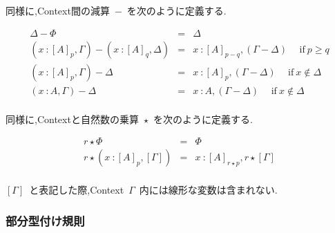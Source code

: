 \documentclass{jsarticle}
\begin{document}
同様に,Context間の減算\ $-$\ を次のように定義する.

\begin{eqnarray*}
  \Delta - \Phi &=& \Delta \\
  (x\ \colon [A]_p,\Gamma) - (x\ \colon [A]_q,\Delta) &=& x\ \colon [A]_{p-q},(\Gamma - \Delta) \hspace{15pt} \mbox{if}\ p \geq q \\
  (x\ \colon [A]_p,\Gamma) - \Delta &=& x\ \colon [A]_p,(\Gamma - \Delta) \hspace{15pt} \mbox{if}\ x \notin \Delta \\
  (x\ \colon A,\Gamma) - \Delta &=& x\ \colon A,(\Gamma - \Delta) \hspace{15pt} \mbox{if}\ x \notin \Delta \\
\end{eqnarray*}

同様に,Contextと自然数の乗算\ $\star$\ を次のように定義する.

\begin{eqnarray*}
  r \star \Phi &=& \Phi \\
  r \star (x\ \colon [A]_p,[\Gamma]) &=& x\ \colon [A]_{r \star p},r \star [\Gamma] \\
\end{eqnarray*}

$[\Gamma]$\ と表記した際,Context\ $\Gamma$\ 内には線形な変数は含まれない.

\subsubsection{部分型付け規則}

\begin{multicols}{2}




  \infrule[o-ic]{}{
    \Gamma <: \Gamma
  }

\end{multicols}
\end{document}
